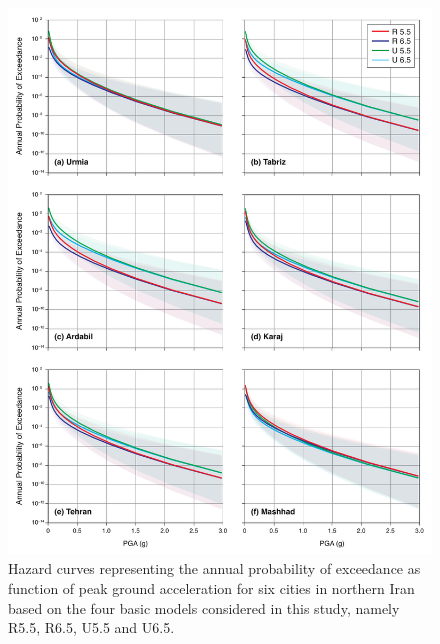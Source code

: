 \begin{figure}[th!]
    \centering
    \includegraphics[width=\textwidth]{figures/pdf/figure-12} 
    \caption{Hazard curves representing the annual probability of exceedance as function of peak ground acceleration for six cities in northern Iran based on the four basic models considered in this study, namely R5.5, R6.5, U5.5 and U6.5.}
    \label{fig:hazardcurve}
\end{figure}


